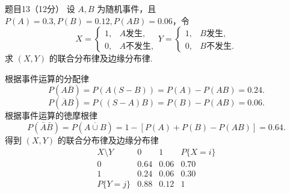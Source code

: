 \begin{question}{题目13（12分）}
    设 $A,B$ 为随机事件，且 $P(A) = 0.3, P(B) = 0.12, P(AB) = 0.06$，令
    $$
        X = \begin{cases}
            1, & A\text{发生},  \\
            0, & A\text{不发生},
        \end{cases}
        Y = \begin{cases}
            1, & B\text{发生},  \\
            0, & B\text{不发生}.
        \end{cases}
    $$
    求 $(X,Y)$ 的联合分布律及边缘分布律.
\end{question}
\begin{solution}
    根据事件运算的分配律
    $$
        P(A\overline{B}) = P(A(S-B)) = P(A) - P(AB) = 0.24.
    $$
    $$
        P(\overline{A}B) = P((S-A)B) = P(B) - P(AB) = 0.06.
    $$
    根据事件运算的徳摩根律
    $$
        P(\bar{A}\bar{B}) = P(\overline{A \cup B})
        = 1 - [P(A) + P(B) - P(AB)]
        = 0.64.
    $$
    得到 $(X,Y)$ 的联合分布律及边缘分布律
    $$
        \begin{array}{c|cc|c}
            X \setminus Y & 0    & 1    & P\{X=i\} \\
            \hline
            0             & 0.64 & 0.06 & 0.70     \\
            1             & 0.24 & 0.06 & 0.30     \\
            \hline
            P\{Y=j\}      & 0.88 & 0.12 & 1        \\
        \end{array}
    $$
\end{solution}

